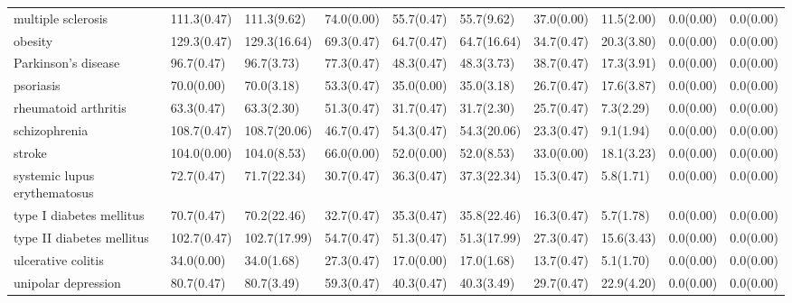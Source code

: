 \begin{table}[H]
{\begin{tabular}{llllllllll}
\addlinespace
multiple sclerosis & 111.3(0.47) & 111.3(9.62) & 74.0(0.00) & 55.7(0.47) & 55.7(9.62) & 37.0(0.00) & 11.5(2.00) & 0.0(0.00) & 0.0(0.00)\\
obesity & 129.3(0.47) & 129.3(16.64) & 69.3(0.47) & 64.7(0.47) & 64.7(16.64) & 34.7(0.47) & 20.3(3.80) & 0.0(0.00) & 0.0(0.00)\\
Parkinson's disease & 96.7(0.47) & 96.7(3.73) & 77.3(0.47) & 48.3(0.47) & 48.3(3.73) & 38.7(0.47) & 17.3(3.91) & 0.0(0.00) & 0.0(0.00)\\
psoriasis & 70.0(0.00) & 70.0(3.18) & 53.3(0.47) & 35.0(0.00) & 35.0(3.18) & 26.7(0.47) & 17.6(3.87) & 0.0(0.00) & 0.0(0.00)\\
rheumatoid arthritis & 63.3(0.47) & 63.3(2.30) & 51.3(0.47) & 31.7(0.47) & 31.7(2.30) & 25.7(0.47) & 7.3(2.29) & 0.0(0.00) & 0.0(0.00)\\
\addlinespace
schizophrenia & 108.7(0.47) & 108.7(20.06) & 46.7(0.47) & 54.3(0.47) & 54.3(20.06) & 23.3(0.47) & 9.1(1.94) & 0.0(0.00) & 0.0(0.00)\\
stroke & 104.0(0.00) & 104.0(8.53) & 66.0(0.00) & 52.0(0.00) & 52.0(8.53) & 33.0(0.00) & 18.1(3.23) & 0.0(0.00) & 0.0(0.00)\\
systemic lupus erythematosus & 72.7(0.47) & 71.7(22.34) & 30.7(0.47) & 36.3(0.47) & 37.3(22.34) & 15.3(0.47) & 5.8(1.71) & 0.0(0.00) & 0.0(0.00)\\
type I diabetes mellitus & 70.7(0.47) & 70.2(22.46) & 32.7(0.47) & 35.3(0.47) & 35.8(22.46) & 16.3(0.47) & 5.7(1.78) & 0.0(0.00) & 0.0(0.00)\\
type II diabetes mellitus & 102.7(0.47) & 102.7(17.99) & 54.7(0.47) & 51.3(0.47) & 51.3(17.99) & 27.3(0.47) & 15.6(3.43) & 0.0(0.00) & 0.0(0.00)\\
\addlinespace
ulcerative colitis & 34.0(0.00) & 34.0(1.68) & 27.3(0.47) & 17.0(0.00) & 17.0(1.68) & 13.7(0.47) & 5.1(1.70) & 0.0(0.00) & 0.0(0.00)\\
unipolar depression & 80.7(0.47) & 80.7(3.49) & 59.3(0.47) & 40.3(0.47) & 40.3(3.49) & 29.7(0.47) & 22.9(4.20) & 0.0(0.00) & 0.0(0.00)\\
\bottomrule
\end{tabular}}
\end{table}
